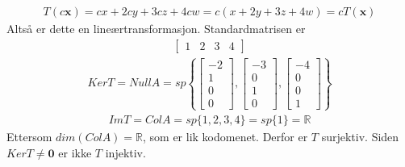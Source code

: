 \documentclass[11pt, a4paper, norsk]{NTNUoving}
\begin{document}
\begin{oppgave}[1]
    \begin{punkt}
        \begin{align*}
            T(c\textbf{x})=cx+2cy+3cz+4cw=c(x+2y+3z+4w)=cT(\textbf{x})
        \end{align*}
            Altså er dette en lineærtransformasjon. 
            Standardmatrisen er 
        \begin{align*}
            \begin{bmatrix}
                1 & 2 & 3 & 4
            \end{bmatrix}
        \end{align*}
        \begin{align*}
        KerT=NullA=sp\left\{
            \begin{bmatrix}
                -2\\1\\0\\0
            \end{bmatrix},
            \begin{bmatrix}
                -3\\0\\1\\0
            \end{bmatrix},
            \begin{bmatrix}
                -4\\0\\0\\1
            \end{bmatrix}
            \right\}
        \end{align*}
        \begin{align*}
            ImT=ColA=sp\{1,2,3,4\}=sp\{1\}=\mathbb{R}
        \end{align*}
        Ettersom $dim(ColA)=\mathbb{R}$, som er lik kodomenet. Derfor er $T$ surjektiv. 
        Siden $KerT\neq \textbf{0}$ er ikke $T$ injektiv. 
    \end{punkt}
\end{oppgave}
\end{document}
